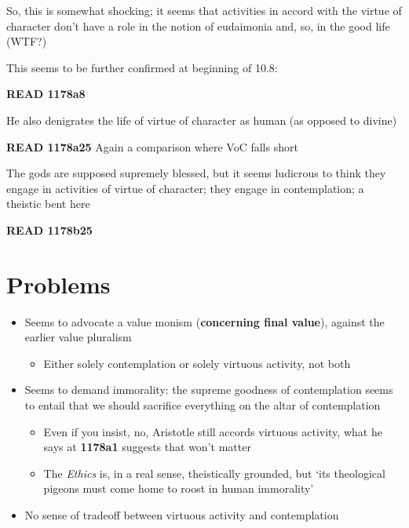 \documentclass[11pt]{article}
\begin{document}
\noindent So, this is somewhat shocking; it seems that activities in accord with the virtue of character don't have a role in the notion of eudaimonia and, so, in the good life (WTF?)
\vspace*{2mm}

\noindent This seems to be further confirmed at beginning of 10.8:
\vspace*{2mm}

\noindent \textbf{READ 1178a8}
\vspace*{2mm}

\noindent He also denigrates the life of virtue of character as human (as opposed to divine)
\vspace*{2mm}

\noindent \textbf{READ 1178a25} Again a comparison where VoC falls short
\vspace*{2mm}

\noindent The gods are supposed supremely blessed, but it seems ludicrous to think they engage in activities of virtue of character; they engage in contemplation; a theistic bent here
\vspace*{2mm}

\noindent \textbf{READ 1178b25}

\section{Problems}

\begin{itemize}\item{Seems to advocate a value monism (\textbf{concerning final value}), against the earlier value pluralism}\begin{itemize}\item{Either solely contemplation or solely virtuous activity, not both}\end{itemize}\item{Seems to demand immorality: the supreme goodness of contemplation seems to entail that we should sacrifice everything on the altar of contemplation}\begin{itemize}\item{Even if you insist, no, Aristotle still accords virtuous activity, what he says at \textbf{1178a1} suggests that won't matter}\item{The \emph{Ethics} is, in a real sense, theistically grounded, but `its theological pigeons must come home to roost in human immorality'}\end{itemize}\item{No sense of tradeoff between virtuous activity and contemplation}\end{itemize}
\end{document}
